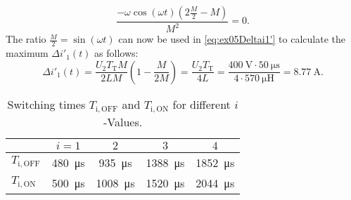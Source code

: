 \begin{solutionblock}
    \begin{equation}
        \frac{-\omega \cos(\omega t)(2 \frac{M}{2}-M)}{M^2}=0.
    \end{equation}
    The ratio $\frac{M}{2}=\sin(\omega t)$ can now be used in \eqref{eq:ex05Deltai1'} to calculate the maximum $\Delta i'_{\mathrm{1}}(t)$ as follows:
    \begin{equation}
        \Delta i'_{\mathrm{1}}(t) = \frac{U_{\mathrm{2}}T_{\mathrm{T}}M}{2LM}\left(1-\frac{M}{2M}\right) = \frac{U_{\mathrm{2}}T_{\mathrm{T}}}{4L}=\frac{\SI{400}{\volt}\cdot \SI{50}{\micro\s}}{4\cdot\SI{570}{\micro\henry}} = \SI{8.77}{\ampere}.
    \end{equation}
\end{solutionblock}


\begin{table}[ht]
    \centering
    
    \begin{tabular}{lcccc}
        \toprule
        & $i = 1$ & $2$ & $3$ & $4$ \\
        \midrule
       $T_\mathrm{i,OFF}$& \SI{480}{\micro\second} & \SI{935}{\micro\second} & \SI{1388}{\micro\second} & \SI{1852}{\micro\second} \\
        $T_\mathrm{i,ON}$  & \SI{500}{\micro\second} & \SI{1008}{\micro\second} & \SI{1520}{\micro\second} & \SI{2044}{\micro\second} \\
        \bottomrule
    \end{tabular}
    \caption{Switching times $T_\mathrm{i,OFF}$ and $T_\mathrm{i,ON}$ for different $i$-Values.}
    \label{tab:switching_times}
\end{table}

